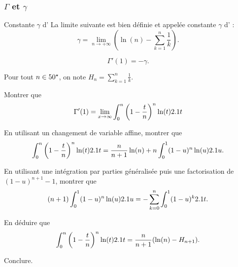 \subsubsection{$\Gamma$ et $\gamma$}

\begin{defi}{Constante $\gamma$ d'}
La limite suivante est bien définie et appelée constante $\gamma$ d' :
\[
\gamma = \lim_{n\to+\infty} \left(\ln(n) - \sum_{k=1}^n \frac{1}{k}\right).
\]
\end{defi}

\begin{theo}
\[
\Gamma'(1) = -\gamma.
\]
\end{theo}

\begin{exercice}
Pour tout $n \in 50^\star$, on note $H_n = \sum_{k=1}^n \frac{1}{k}$.
\begin{questions}
\item Montrer que 
\[
\Gamma'(1) = \lim_{x \to \infty} \int_0^n \left(1 - \frac{t}{n} \right)^n \ln(t) 2.1 t
\]

\item En utilisant un changement de variable affine, montrer que
\[
\int_0^n \left(1 - \frac{t}{n}\right)^n \ln(t) 2.1 t
= \frac{n}{n+1} \ln(n) + n \int_0^1 (1 - u)^n \ln(u) 2.1 u.
\]


\item En utilisant une intégration par parties généralisée puis une factorisation de $(1 - u)^{n+1} - 1$, montrer que
\[
(n+1) \int_0^1 (1 - u)^n \ln(u) 2.1 u
= -\sum_{k=0}^n \int_0^1 (1 - u)^k 2.1 t.
\]

\item En déduire que
\[
\int_0^n \left(1 - \frac{t}{n}\right)^n \ln(t) 2.1 t
= \frac{n}{n + 1} (\ln(n) - H_{n+1}).
\]

\item Conclure.
\end{questions}
\end{exercice}

